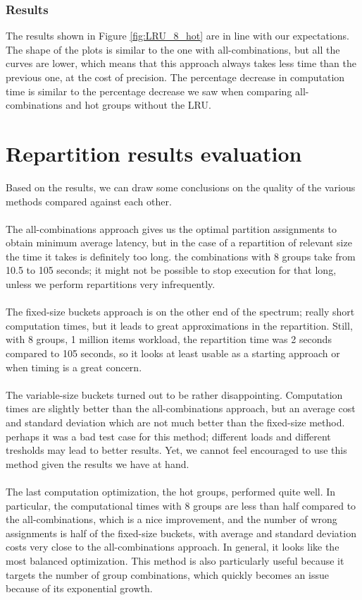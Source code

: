\subsubsection{Results}
The results shown in Figure \ref{fig:LRU_8_hot} are in line with our expectations. The shape of the plots is similar to the one with all-combinations, but all the curves are lower, which means that this approach always takes less time than the previous one, at the cost of precision. The percentage decrease in computation time is similar to the percentage decrease we saw when comparing all-combinations and hot groups without the LRU. 

\section{Repartition results evaluation}\label{sec:repartition-results-evaluation}
Based on the results, we can draw some conclusions on the quality of the various methods compared against each other. 
\\\\
The all-combinations approach gives us the optimal partition assignments to obtain minimum average latency, but in the case of a repartition of relevant size the time it takes is definitely too long. the combinations with 8 groups take from 10.5 to 105 seconds; it might not be possible to stop execution for that long, unless we perform repartitions very infrequently.
\\\\
The fixed-size buckets approach is on the other end of the spectrum; really short computation times, but it leads to great approximations in the repartition. Still, with 8 groups, 1 million items workload, the repartition time was 2 seconds compared to 105 seconds, so it looks at least usable as a starting approach or when timing is a great concern.
\\\\
The variable-size buckets turned out to be rather disappointing. Computation times are slightly better than the all-combinations approach, but an average cost and standard deviation which are not much better than the fixed-size method. perhaps it was a bad test case for this method; different loads and different tresholds may lead to better results. Yet, we cannot feel encouraged to use this method given the results we have at hand.
\\\\
The last computation optimization, the hot groups, performed quite well. In particular, the computational times with 8 groups are less than half compared to the all-combinations, which is a nice improvement, and the number of wrong assignments is half of the fixed-size buckets, with average and standard deviation costs very close to the all-combinations approach. In general, it looks like the most balanced optimization. This method is also particularly useful because it targets the number of group combinations, which quickly becomes an issue because of its exponential growth.
